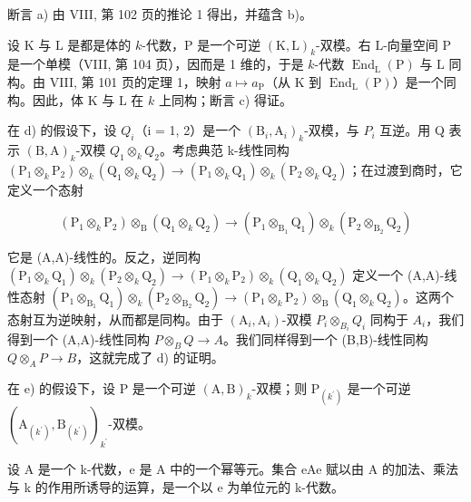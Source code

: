 断言 a) 由 VIII, 第 102 页的推论 1 得出，并蕴含 b)。

设 \(\mathrm{K}\) 与 \(\mathrm{L}\) 是都是体的 \(k\)-代数，\(\mathrm{P}\) 是一个可逆 \((\mathrm{K},\mathrm{L})_k\)-双模。右 \(\mathrm{L}\)-向量空间 \(\mathrm{P}\) 是一个单模（VIII, 第 104 页），因而是 1 维的，于是 \(k\)-代数 \(\operatorname{End}_{\mathrm{L}}(\mathrm{P})\) 与 \(\mathrm{L}\) 同构。由 VIII, 第 101 页的定理 1，映射 \(a\mapsto a_{\mathrm{P}}\)（从 \(\mathrm{K}\) 到 \(\operatorname{End}_{\mathrm{L}}(\mathrm{P})\)）是一个同构。因此，体 \(\mathrm{K}\) 与 \(\mathrm{L}\) 在 \(k\) 上同构；断言 c) 得证。

在 d) 的假设下，设 \(Q_{i}\)（i = 1, 2）是一个 \((\mathrm{B}_{i}, \mathrm{A}_{i})_{k}\)-双模，与 \(P_{i}\) 互逆。用 Q 表示 \((\mathrm{B}, \mathrm{A})_{k}\)-双模 \(Q_{1} \otimes_{k} Q_{2}\)。考虑典范 k-线性同构 \((\mathrm{P}_{1} \otimes_{k} \mathrm{P}_{2}) \otimes_{k} (\mathrm{Q}_{1} \otimes_{k} \mathrm{Q}_{2}) \to (\mathrm{P}_{1} \otimes_{k} \mathrm{Q}_{1}) \otimes_{k} (\mathrm{P}_{2} \otimes_{k} \mathrm{Q}_{2})\)；在过渡到商时，它定义一个态射

\[
\left(\mathrm{P} _ {1} \otimes_ {k} \mathrm{P} _ {2}\right) \otimes_ {\mathrm{B}} \left(\mathrm{Q} _ {1} \otimes_ {k} \mathrm{Q} _ {2}\right)\rightarrow \left(\mathrm{P} _ {1} \otimes_ {\mathrm{B} _ {1}} \mathrm{Q} _ {1}\right) \otimes_ {k} \left(\mathrm{P} _ {2} \otimes_ {\mathrm{B} _ {2}} \mathrm{Q} _ {2}\right)
\]

它是 (A,A)-线性的。反之，逆同构 \((\mathrm{P}_{1}\otimes_{k}\mathrm{Q}_{1})\otimes_{k}(\mathrm{P}_{2}\otimes_{k}\mathrm{Q}_{2})\to(\mathrm{P}_{1}\otimes_{k}\mathrm{P}_{2})\otimes_{k}(\mathrm{Q}_{1}\otimes_{k}\mathrm{Q}_{2})\) 定义一个 (A,A)-线性态射 \((\mathrm{P}_{1}\otimes_{\mathrm{B}_{1}}\mathrm{Q}_{1})\otimes_{k}(\mathrm{P}_{2}\otimes_{\mathrm{B}_{2}}\mathrm{Q}_{2})\to(\mathrm{P}_{1}\otimes_{k}\mathrm{P}_{2})\otimes_{\mathrm{B}}(\mathrm{Q}_{1}\otimes_{k}\mathrm{Q}_{2})\)。这两个态射互为逆映射，从而都是同构。由于 \((\mathrm{A}_{i},\mathrm{A}_{i})\)-双模 \(P_{i}\otimes_{B_{i}}Q_{i}\) 同构于 \(A_{i}\)，我们得到一个 (A,A)-线性同构 \(P\otimes_{B}Q\to A\)。我们同样得到一个 (B,B)-线性同构 \(Q\otimes_{A}P\to B\)，这就完成了 d) 的证明。

在 e) 的假设下，设 P 是一个可逆 \((\mathrm{A},\mathrm{B})_{k}\)-双模；则 \(\mathrm{P}_{(k^{\prime})}\) 是一个可逆 \((\mathrm{A}_{(k^{\prime})},\mathrm{B}_{(k^{\prime})})_{k^{\prime}}\)-双模。

设 A 是一个 k-代数，e 是 A 中的一个幂等元。集合 eAe 赋以由 A 的加法、乘法与 k 的作用所诱导的运算，是一个以 e 为单位元的 k-代数。

